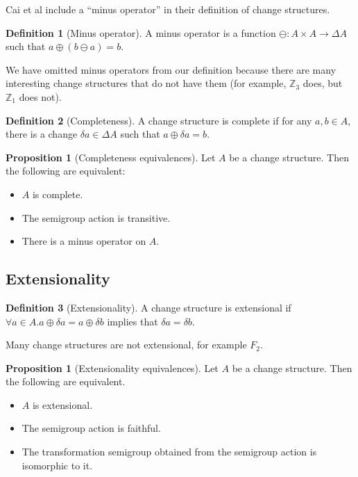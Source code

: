 \documentclass[english]{article}
\theoremstyle{plain}
\theoremstyle{definition}
\newtheorem{prop}[thm]{Proposition}
\theoremstyle{remark}
\theoremstyle{remark}
\theoremstyle{remark}
\theoremstyle{definition}
\newtheorem{defn}{Definition}
\newcommand{\cplus}{\oplus}
\newcommand{\cminus}{\ominus}
\newcommand{\changes}[1]{\Delta #1}
\newcommand{\change}[1]{\delta #1}
\begin{document}
Cai et al include a ``minus operator'' in their definition of change structures. 

\begin{defn}[Minus operator]
  A minus operator is a function $\cminus: A \times A \rightarrow \changes{A}$
  such that $a \cplus (b \cminus a) = b$.
\end{defn}

We have omitted minus operators from our definition because
there are many interesting change structures that do not have them (for example,
$\mathbb{Z}_3$ does, but $\mathbb{Z}_1$ does not).

\begin{defn}[Completeness]
  A change structure is complete if for any $a, b \in A$, there is
  a change $\change{a} \in \changes{A}$ such that $a \cplus \change{a} = b$.
\end{defn}

\begin{prop}[Completeness equivalences]
  Let $A$ be a change structure. Then the following are equivalent:
  \begin{itemize}
    \item $A$ is complete.
    \item The semigroup action is transitive.
    \item There is a minus operator on $A$.
  \end{itemize}
\end{prop}

\subsection{Extensionality}

\begin{defn}[Extensionality]
  A change structure is extensional if $\forall a \in A. a \cplus \change{a}
  = a \cplus \change{b}$ implies that $\change{a} = \change{b}$.
\end{defn}

Many change structures are not extensional, for example $F_2$.

\begin{prop}[Extensionality equivalences]
  Let $A$ be a change structure. Then the following are equivalent.
  \begin{itemize}
    \item $A$ is extensional.
    \item The semigroup action is faithful.
    \item The transformation semigroup obtained from the semigroup action is
      isomorphic to it.
  \end{itemize}
\end{prop}
\end{document}
